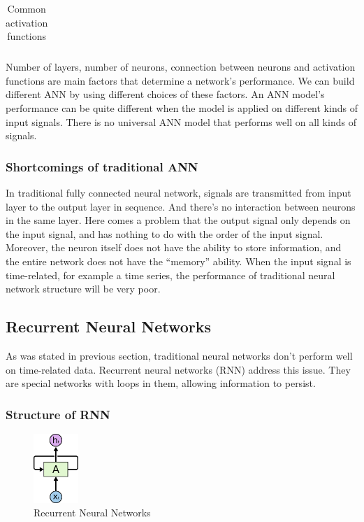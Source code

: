 \begin{table}[]
\begin{tabular}{|c|c|c|}
\begin{minipage}[b]{0.25\columnwidth}
	\end{minipage}\\ \hline
\end{tabular}
\caption{Common activation functions}
\end{table}

Number of layers, number of neurons, connection between neurons and activation functions are main factors that determine a network's performance. We can build different ANN by using different choices of these factors. An ANN model's performance can be quite different when the model is applied on different kinds of input signals. There is no universal ANN model that performs well on all kinds of signals.

\subsubsection{Shortcomings of traditional ANN}

In traditional fully connected neural network, signals are transmitted from input layer to the output layer in sequence. And there's no interaction between neurons in the same layer. Here comes a problem that the output signal only depends on the input signal, and has nothing to do with the order of the input signal. Moreover, the neuron itself does not have the ability to store information, and the entire network does not have the “memory” ability. When the input signal is time-related, for example a time series, the performance of traditional neural network structure 
will be very poor.

\subsection{Recurrent Neural Networks}
As was stated in previous section, traditional neural networks don't perform well on time-related data. Recurrent neural networks (RNN) address this issue. They are special networks with loops in them, allowing information to persist.

\subsubsection{Structure of RNN}

\begin{figure}[]
\centering
\includegraphics[width=0.15\textwidth]{figures/RNN-rolled.png}
\caption{Recurrent Neural Networks}
\label{fig:B-B1}
\end{figure}

